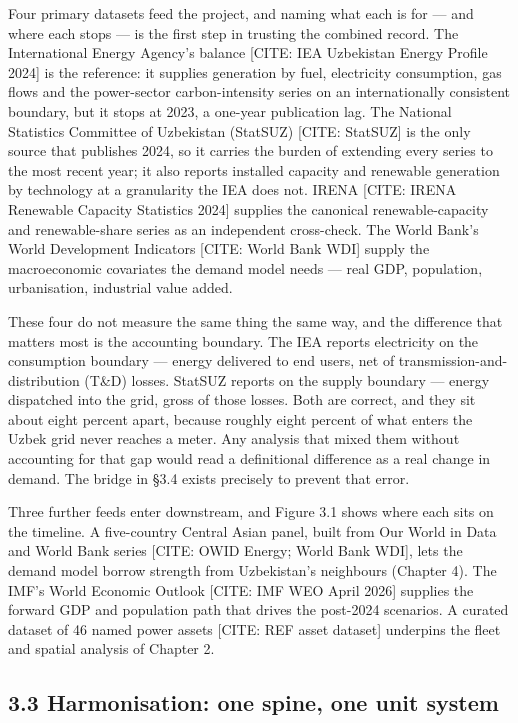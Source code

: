 \documentclass[10pt,twocolumn]{article}
\newcommand{\mk}[1]{{\color{amber}\small #1}}
\begin{document}
Four primary datasets feed the project, and naming what each is for --- and where each stops --- is the first step in trusting the combined record. The International Energy Agency's balance \mk{[CITE: IEA Uzbekistan Energy Profile 2024]} is the reference: it supplies generation by fuel, electricity consumption, gas flows and the power-sector carbon-intensity series on an internationally consistent boundary, but it stops at 2023, a one-year publication lag. The National Statistics Committee of Uzbekistan (StatSUZ) \mk{[CITE: StatSUZ]} is the only source that publishes 2024, so it carries the burden of extending every series to the most recent year; it also reports installed capacity and renewable generation by technology at a granularity the IEA does not. IRENA \mk{[CITE: IRENA Renewable Capacity Statistics 2024]} supplies the canonical renewable-capacity and renewable-share series as an independent cross-check. The World Bank's World Development Indicators \mk{[CITE: World Bank WDI]} supply the macroeconomic covariates the demand model needs --- real GDP, population, urbanisation, industrial value added.

These four do not measure the same thing the same way, and the difference that matters most is the accounting boundary. The IEA reports electricity on the consumption boundary --- energy delivered to end users, net of transmission-and-distribution (T\&D) losses. StatSUZ reports on the supply boundary --- energy dispatched into the grid, gross of those losses. Both are correct, and they sit about eight percent apart, because roughly eight percent of what enters the Uzbek grid never reaches a meter. Any analysis that mixed them without accounting for that gap would read a definitional difference as a real change in demand. The bridge in \S{}3.4 exists precisely to prevent that error.

Three further feeds enter downstream, and Figure 3.1 shows where each sits on the timeline. A five-country Central Asian panel, built from Our World in Data and World Bank series \mk{[CITE: OWID Energy; World Bank WDI]}, lets the demand model borrow strength from Uzbekistan's neighbours (Chapter 4). The IMF's World Economic Outlook \mk{[CITE: IMF WEO April 2026]} supplies the forward GDP and population path that drives the post-2024 scenarios. A curated dataset of 46 named power assets \mk{[CITE: REF asset dataset]} underpins the fleet and spatial analysis of Chapter 2.

\subsection*{3.3 Harmonisation: one spine, one unit system}
\end{document}
